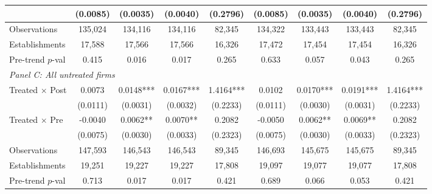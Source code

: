 \begin{table}[H]
\begin{tabular}{lcccccccc}
& (0.0085) & (0.0035) & (0.0040) & (0.2796) & (0.0085) & (0.0035) & (0.0040) & (0.2796) \\[3pt]
\midrule
Observations & 135,024 & 134,116 & 134,116 & 82,345 & 134,322 & 133,443 & 133,443 & 82,345 \\
Establishments & 17,588 & 17,566 & 17,566 & 16,326 & 17,472 & 17,454 & 17,454 & 16,326 \\
Pre-trend $p$-val & 0.415 & 0.016 & 0.017 & 0.265 & 0.633 & 0.057 & 0.043 & 0.265 \\
\midrule
\multicolumn{9}{l}{\textit{Panel C: All untreated firms}} \\
\midrule
Treated $\times$ Post & 0.0073 & 0.0148*** & 0.0167*** & 1.4164*** & 0.0102 & 0.0170*** & 0.0191*** & 1.4164*** \\
& (0.0111) & (0.0031) & (0.0032) & (0.2233) & (0.0111) & (0.0030) & (0.0031) & (0.2233) \\[3pt]
Treated $\times$ Pre & -0.0040 & 0.0062** & 0.0070** & 0.2082 & -0.0050 & 0.0062** & 0.0069** & 0.2082 \\
& (0.0075) & (0.0030) & (0.0033) & (0.2323) & (0.0075) & (0.0030) & (0.0033) & (0.2323) \\[3pt]
\midrule
Observations & 147,593 & 146,543 & 146,543 & 89,345 & 146,693 & 145,675 & 145,675 & 89,345 \\
Establishments & 19,251 & 19,227 & 19,227 & 17,808 & 19,097 & 19,077 & 19,077 & 17,808 \\
Pre-trend $p$-val & 0.713 & 0.017 & 0.017 & 0.421 & 0.689 & 0.066 & 0.053 & 0.421 \\
\bottomrule
\end{tabular}
\begin{minipage}{\textwidth}
\footnotesize
\medskip

\end{minipage}
\end{table}
